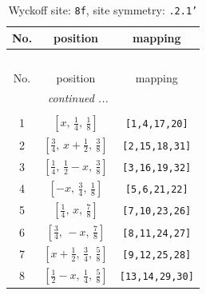 \documentclass[fleqn,8pt]{jsarticle}
\begin{document}
\begin{longtable}{ccc}
\caption{Wyckoff site: {\tt 8f}, site symmetry: {\tt .2.1'}}
 \\
 \hline \hline
No. & position & mapping \\ \hline \endfirsthead

\multicolumn{2}{l}{\tablename\ \thetable{}} \\
 \hline \hline
No. & position & mapping \\ \hline \endhead

 \hline \hline
\multicolumn{2}{r}{\footnotesize\it continued ...} \\ \endfoot

 \hline \hline
\multicolumn{2}{r}{} \\ \endlastfoot

1 & $\left[ x,\, \frac{1}{4},\, \frac{1}{8} \right]$ & {\tt [1,4,17,20]} \\ \hline
2 & $\left[ \frac{3}{4},\, x + \frac{1}{2},\, \frac{3}{8} \right]$ & {\tt [2,15,18,31]} \\ \hline
3 & $\left[ \frac{1}{4},\, \frac{1}{2} - x,\, \frac{3}{8} \right]$ & {\tt [3,16,19,32]} \\ \hline
4 & $\left[ - x,\, \frac{3}{4},\, \frac{1}{8} \right]$ & {\tt [5,6,21,22]} \\ \hline
5 & $\left[ \frac{1}{4},\, x,\, \frac{7}{8} \right]$ & {\tt [7,10,23,26]} \\ \hline
6 & $\left[ \frac{3}{4},\, - x,\, \frac{7}{8} \right]$ & {\tt [8,11,24,27]} \\ \hline
7 & $\left[ x + \frac{1}{2},\, \frac{3}{4},\, \frac{5}{8} \right]$ & {\tt [9,12,25,28]} \\ \hline
8 & $\left[ \frac{1}{2} - x,\, \frac{1}{4},\, \frac{5}{8} \right]$ & {\tt [13,14,29,30]} \\
\end{longtable}
\renewcommand{\arraystretch}{1.2}
\end{document}
